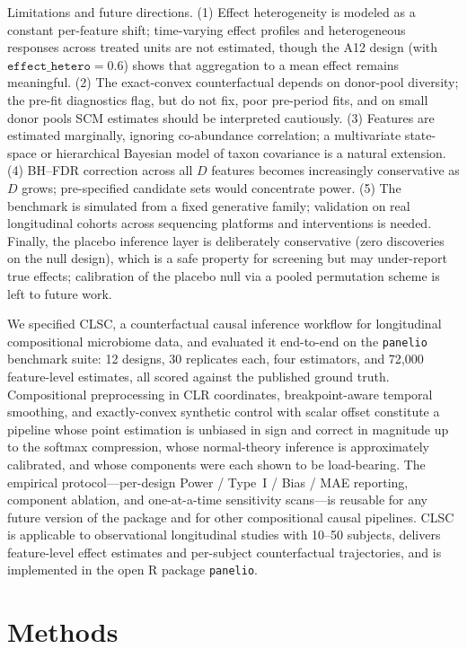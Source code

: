 \documentclass[11pt]{article}
\begin{document}
Limitations and future directions. (1) Effect heterogeneity is modeled as a constant per-feature
shift; time-varying effect profiles and heterogeneous responses across treated units are not
estimated, though the A12 design (with $\texttt{effect\_hetero}=0.6$) shows that aggregation to a
mean effect remains meaningful. (2) The exact-convex counterfactual depends on donor-pool diversity;
the pre-fit diagnostics flag, but do not fix, poor pre-period fits, and on small donor pools SCM
estimates should be interpreted cautiously. (3) Features are estimated marginally, ignoring
co-abundance correlation; a multivariate state-space or hierarchical Bayesian model of taxon
covariance is a natural extension. (4) BH--FDR correction across all $D$ features becomes
increasingly conservative as $D$ grows; pre-specified candidate sets would concentrate power.
(5) The benchmark is simulated from a fixed generative family; validation on real longitudinal
cohorts across sequencing platforms and interventions is needed. Finally, the placebo inference
layer is deliberately conservative (zero discoveries on the null design), which is a safe property
for screening but may under-report true effects; calibration of the placebo null via a pooled
permutation scheme is left to future work.

We specified CLSC, a counterfactual causal inference workflow for longitudinal compositional
microbiome data, and evaluated it end-to-end on the \texttt{panelio} benchmark suite: 12 designs,
30 replicates each, four estimators, and 72{,}000 feature-level estimates, all scored against the
published ground truth. Compositional preprocessing in CLR coordinates, breakpoint-aware temporal
smoothing, and exactly-convex synthetic control with scalar offset constitute a pipeline whose
point estimation is unbiased in sign and correct in magnitude up to the softmax compression, whose
normal-theory inference is approximately calibrated, and whose components were each shown to be
load-bearing. The empirical protocol---per-design Power / Type~I / Bias / MAE reporting,
component ablation, and one-at-a-time sensitivity scans---is reusable for any future version of
the package and for other compositional causal pipelines. CLSC is applicable to observational
longitudinal studies with 10--50 subjects, delivers feature-level effect estimates and per-subject
counterfactual trajectories, and is implemented in the open R package \texttt{panelio}.

\section{Methods}\label{sec:methods}
\end{document}
